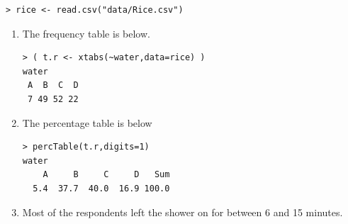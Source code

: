 \documentclass[10pt,openany]{book}\usepackage[]{graphicx}\usepackage[]{color}
\makeatletter
\newenvironment{kframe}{%
 \def\at@end@of@kframe{}%
 \ifinner\ifhmode%
  \def\at@end@of@kframe{\end{minipage}}%
  \begin{minipage}{\columnwidth}%
 \fi\fi%
 \def\FrameCommand##1{\hskip\@totalleftmargin \hskip-\fboxsep
 \colorbox{shadecolor}{##1}\hskip-\fboxsep
     \hskip-\linewidth \hskip-\@totalleftmargin \hskip\columnwidth}%
 \MakeFramed {\advance\hsize-\width
   \@totalleftmargin\z@ \linewidth\hsize
   \@setminipage}}%
 {\par\unskip\endMakeFramed%
 \at@end@of@kframe}
\newenvironment{knitrout}{}{} %
\makeatother
\begin{document}
\begin{itemize}
\begin{knitrout}
\color{fgcolor}\begin{kframe}
\begin{verbatim}
> rice <- read.csv("data/Rice.csv")
\end{verbatim}
\end{kframe}
\end{knitrout}
  \begin{enumerate}
    \item The frequency table is below.
\begin{knitrout}
\color{fgcolor}\begin{kframe}
\begin{verbatim}
> ( t.r <- xtabs(~water,data=rice) )
water
 A  B  C  D 
 7 49 52 22 
\end{verbatim}
\end{kframe}
\end{knitrout}
    \item The percentage table is below
\begin{knitrout}
\color{fgcolor}\begin{kframe}
\begin{verbatim}
> percTable(t.r,digits=1)
water
    A     B     C     D   Sum 
  5.4  37.7  40.0  16.9 100.0 
\end{verbatim}
\end{kframe}
\end{knitrout}
    \item Most of the respondents left the shower on for between 6 and 15 minutes.
  \end{enumerate}
\end{itemize}




\end{document}
